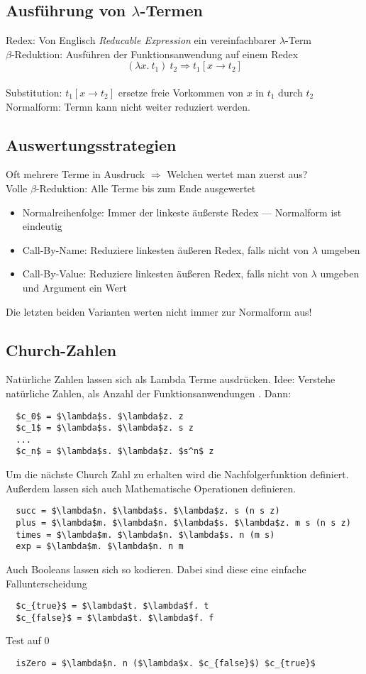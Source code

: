 \subsection{Ausführung von \(\lambda\)-Termen}
Redex: Von Englisch \textit{Reducable Expression} ein vereinfachbarer \(\lambda\)-Term\\
\(\beta\)-Reduktion: Ausführen der Funktionsanwendung auf einem Redex \[(\lambda x.\ t_1)\ t_2 \Rightarrow t_1 [x \rightarrow t_2]\]\\
Substitution: \(t_1 [x \rightarrow t_2]\) ersetze freie Vorkommen von \(x\) in \(t_1\) durch \(t_2\)\\
Normalform: Termn kann nicht weiter reduziert werden.

\subsection{Auswertungsstrategien}
Oft mehrere Terme in Ausdruck \(\Rightarrow\) Welchen wertet man zuerst aus?\\
Volle \(\beta\)-Reduktion: Alle Terme bis zum Ende ausgewertet
\begin{itemize}
  \item Normalreihenfolge: Immer der linkeste äußerste Redex --- Normalform ist eindeutig
  \item Call-By-Name: Reduziere linkesten äußeren Redex, falls nicht von \(\lambda\) umgeben
  \item Call-By-Value: Reduziere linkesten äußeren Redex, falls nicht von \(\lambda\) umgeben und Argument ein Wert
\end{itemize}
Die letzten beiden Varianten werten nicht immer zur Normalform aus!

\subsection{Church-Zahlen}
Natürliche Zahlen lassen sich als Lambda Terme ausdrücken.
Idee: Verstehe natürliche Zahlen, als Anzahl der Funktionsanwendungen . Dann:
\begin{lstlisting}
  $c_0$ = $\lambda$s. $\lambda$z. z
  $c_1$ = $\lambda$s. $\lambda$z. s z
  ...
  $c_n$ = $\lambda$s. $\lambda$z. $s^n$ z

\end{lstlisting}
Um die nächste Church Zahl zu erhalten wird die Nachfolgerfunktion  definiert.
Außerdem lassen sich auch Mathematische Operationen definieren.
\begin{lstlisting}
  succ = $\lambda$n. $\lambda$s. $\lambda$z. s (n s z)
  plus = $\lambda$m. $\lambda$n. $\lambda$s. $\lambda$z. m s (n s z)
  times = $\lambda$m. $\lambda$n. $\lambda$s. n (m s)
  exp = $\lambda$m. $\lambda$n. n m
\end{lstlisting}
Auch Booleans lassen sich so kodieren. Dabei sind diese eine einfache Fallunterscheidung
\begin{lstlisting}
  $c_{true}$ = $\lambda$t. $\lambda$f. t
  $c_{false}$ = $\lambda$t. $\lambda$f. f
\end{lstlisting}
Test auf 0
\begin{lstlisting}
  isZero = $\lambda$n. n ($\lambda$x. $c_{false}$) $c_{true}$
\end{lstlisting}

